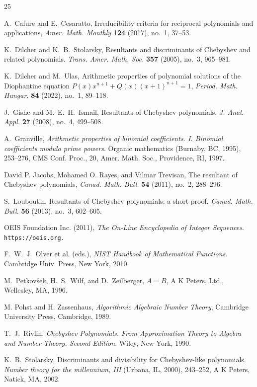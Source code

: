 \documentclass{amsart}
\theoremstyle{plain}
\numberwithin{equation}{section}
\begin{document}
\begin{thebibliography}{25}

 A.~Cafure and E.~Cesaratto, Irreducibility criteria for reciprocal
polynomials and applications, {\it Amer. Math. Monthly} {\bf 124} (2017), 
no.~1, 37--53.

 K.~Dilcher and K.~B.~Stolarsky, Resultants and discriminants of
Chebyshev and related polynomials. {\it Trans. Amer. Math. Soc.} {\bf 357}
(2005), no.~3, 965--981.

 K.~Dilcher and M.~Ulas, Arithmetic properties of polynomial 
solutions of the Diophantine equation $P(x)x^{n+1}+Q(x)(x+1)^{n+1}=1$,
{\it Period. Math. Hungar.} {\bf 84} (2022), no.~1, 89--118.

 J.~Gishe and M.~E.~H.~Ismail, Resultants of Chebyshev polynomials,
{\it J. Anal. Appl.} {\bf 27} (2008), no.~4, 499--508.

 A.~Granville, {\it Arithmetic properties of binomial coefficients.
I. Binomial coefficients modulo prime powers\/}. Organic mathematics (Burnaby,
BC, 1995), 253--276, CMS Conf. Proc., 20, Amer. Math. Soc., Providence, RI,
1997.

 David P. Jacobs, Mohamed O. Rayes, and Vilmar Trevisan, 
The resultant of Chebyshev polynomials,
{\it Canad. Math. Bull.} {\bf 54} (2011), no.~2, 288--296.

 S.~Louboutin, Resultants of Chebyshev polynomials: a short proof,
{\it Canad. Math. Bull.} {\bf 56} (2013), no.~3, 602--605.

OEIS Foundation Inc. (2011), {\it The On-Line Encyclopedia of Integer 
Sequences}.\\
\tt{https://oeis.org}.\rm

 F.~W.~J.~Olver et al. (eds.), {\it NIST Handbook of Mathematical
Functions\/}. Cambridge Univ. Press, New York, 2010.

 M.~Petkov{\v s}ek, H.~S.~Wilf, and D.~Zeilberger, $A=B$,
A K Peters, Ltd., Wellesley, MA, 1996.

 M. Pohst and H. Zassenhaus, {\it Algorithmic Algebraic Number
Theory\/}, Cambridge University Press, Cambridge, 1989.

 T.~J.~Rivlin, {\it Chebyshev Polynomials. From Approximation 
Theory to Algebra and Number Theory. Second Edition}. Wiley, New York, 1990.

 K.~B.~Stolarsky, Discriminants and divisibility for Chebyshev-like
polynomials. {\it Number theory for the millennium, III} (Urbana, IL, 2000),
243--252, A K Peters, Natick, MA, 2002.


\end{thebibliography}
\end{document}
